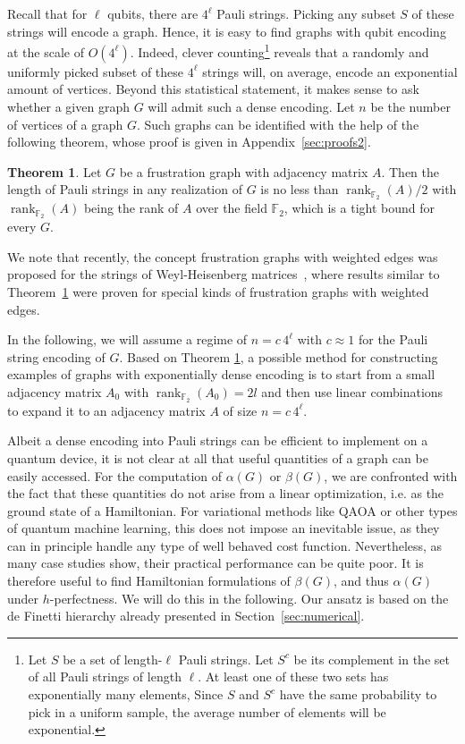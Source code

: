 \documentclass[
12pt,
prx,
aps,
reprint,
a4paper,
longbibliograph,
nofootinbib,
nobibnotes,
superscriptaddress
]{revtex4-2}
\theoremstyle{definition}
\newtheorem{theorem}{Theorem}
\begin{document}
Recall that for  $\ell$ qubits, there are $4^\ell$ Pauli strings. Picking any subset $S$ of these strings will encode a graph. 
Hence, it is easy to find graphs with qubit encoding at the scale of $O(4^\ell)$. Indeed, clever counting\footnote{Let $S$ be a set of length-$\ell$ Pauli strings. Let $S^c$ be its complement in the set of all Pauli strings of length $\ell$. At least one of these two sets has exponentially many elements, Since $S$ and $S^c$ have the same probability to pick in a uniform sample, the average number of elements will be exponential.} reveals that a randomly and uniformly picked subset of these $4^\ell$ strings will, on average, encode an exponential amount of vertices. 
Beyond this statistical statement, it makes sense to ask whether a given graph $G$ will admit such a dense encoding. Let  $n$ be the number of vertices of a graph $G$.  Such graphs can be identified with the help of the following theorem, whose proof is given in Appendix~\ref{sec:proofs2}.

\begin{theorem}
\label{thm:minlen1}
Let $G$ be a frustration graph with adjacency matrix $A$.  Then the length of Pauli strings in any realization of $G$ is no less than ${\operatorname{rank}_{\mathbb{F}_2}(A)}/2$  with $\operatorname{rank}_{\mathbb{F}_2}(A)$ being the rank of $A$ over the field $\mathbb{F}_2$, which is a tight bound for every $G$.
\end{theorem}
 We note that recently, the concept frustration graphs with weighted edges was proposed for the strings of Weyl-Heisenberg matrices~\cite{Makuta2025FrustrationGF}, where results similar to Theorem~\ref{thm:minlen1} were proven for special kinds of frustration graphs with weighted edges.
 
In the following, we will assume a regime of $n=c\, 4^\ell$ with $c\approx 1$ for the Pauli string encoding of $G$. 
Based on Theorem \ref{thm:minlen1}, a possible  method for  constructing examples of  graphs with exponentially dense encoding is to  start from a small adjacency matrix $A_0$ with $\operatorname{rank}_{\mathbb{F}_2}(A_0) = 2l$ and then use linear combinations to expand it to an adjacency matrix $A$ of size $n = c\, 4^\ell$. 

Albeit a dense encoding into Pauli strings can be efficient to implement on a quantum device, it is not clear at all that useful quantities of a graph can be easily accessed. For the computation of $\alpha(G)$ or $\beta(G)$, we are confronted with the fact that these quantities do not arise from a linear optimization, i.e. as the ground state of a Hamiltonian. For variational methods like QAOA or other types of quantum machine learning, this does not impose an inevitable issue, as they can in principle handle any type of well behaved cost function. Nevertheless, as many case studies show,  their practical performance can be quite poor. 
It is therefore useful to find Hamiltonian formulations of $\beta(G)$, and thus $\alpha(G)$ under $h$-perfectness. 
We will do this in the following. Our ansatz is based on the de Finetti hierarchy already presented in Section~\ref{sec:numerical}.
\end{document}
